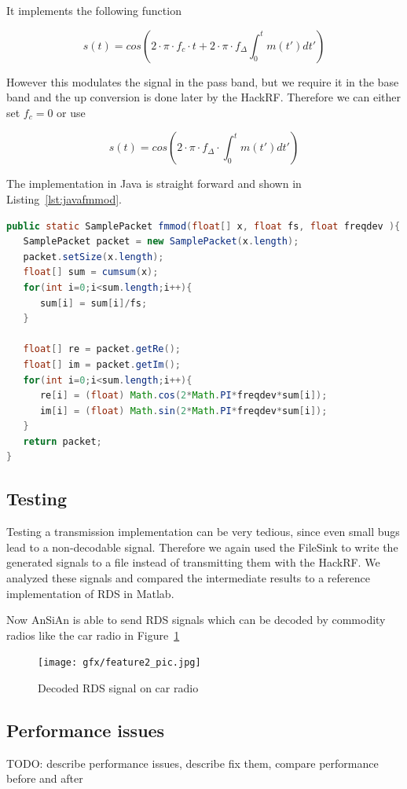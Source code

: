 It implements the following function 

\begin{equation}
 s(t) = cos\left(2\cdot \pi \cdot f_c \cdot t + 2\cdot \pi\cdot f_\Delta \int_{0}^{t}m(t')dt'\right)
\end{equation}

However this modulates the signal in the pass band, but we require it in the base band and the up conversion is done later by the HackRF. Therefore we can either set $f_c=0$ or use 

\begin{equation}
s(t) = cos\left(2\cdot \pi \cdot f_\Delta  \cdot \int_{0}^{t}m(t')dt'\right)
\end{equation}


The implementation in Java is straight forward and shown in Listing~\ref{lst:javafmmod}.
\begin{lstlisting}[label=lst:javafmmod, caption=Java Implementation of fmmod, language=java,]
public static SamplePacket fmmod(float[] x, float fs, float freqdev ){
   SamplePacket packet = new SamplePacket(x.length);
   packet.setSize(x.length);
   float[] sum = cumsum(x);
   for(int i=0;i<sum.length;i++){
      sum[i] = sum[i]/fs;
   }
	
   float[] re = packet.getRe();
   float[] im = packet.getIm();
   for(int i=0;i<sum.length;i++){
      re[i] = (float) Math.cos(2*Math.PI*freqdev*sum[i]);
      im[i] = (float) Math.sin(2*Math.PI*freqdev*sum[i]);
   }
   return packet;
}

\end{lstlisting}



\subsection{Testing} 
Testing a transmission implementation can be very tedious, since even small bugs lead to a non-decodable signal. Therefore we again used the FileSink to write the generated signals to a file instead of transmitting them with the HackRF. We analyzed these signals and compared the intermediate results to a reference implementation of RDS in Matlab. 

Now AnSiAn is able to send RDS signals which can be decoded by commodity radios like the car radio in Figure~\ref{fig:impl:picrds}

\begin{figure}
	\centering
	\texttt{[image: gfx/feature2\_pic.jpg]}
	\caption{Decoded RDS signal on car radio}
	\label{fig:impl:picrds}
\end{figure}

\subsection{Performance issues}

TODO: describe performance issues, describe fix them, compare performance before and after 
